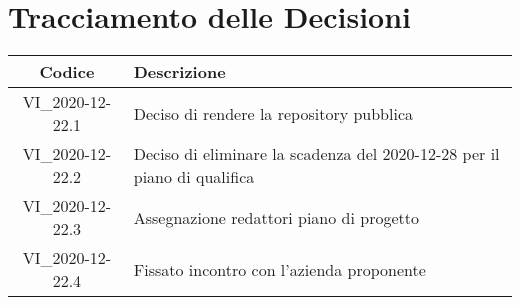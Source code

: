 \section*{Tracciamento delle Decisioni}

\begin{center}
	\begin{longtable}{|c|p{14.5cm}|}
		\hline
		\rowcolor{lighter-grayer}
		\textbf{Codice} & \textbf{Descrizione}                     \\
		\hline
		\endfirsthead

		\hline
		VI\_2020-12-22.1          & Deciso di rendere la repository pubblica \\
		VI\_2020-12-22.2          & Deciso di eliminare la scadenza del 2020-12-28 per il piano di qualifica \\
		VI\_2020-12-22.3          & Assegnazione redattori piano di progetto \\
		VI\_2020-12-22.4          & Fissato incontro con l'azienda proponente \\
		\hline
	\end{longtable}
\end{center}